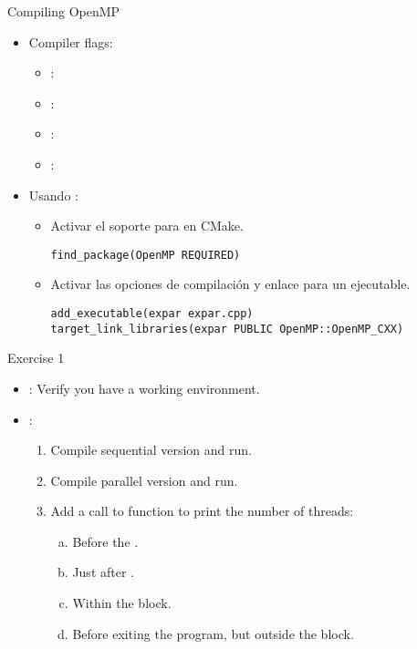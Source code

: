 \begin{frame}[t,fragile]{Compiling OpenMP}

\begin{itemize}
  \item Compiler flags: 
    \begin{itemize}
      \item {}: 
      \item {}: 
      \item {}: 
      \item {}: 
    \end{itemize}

  \item Usando :
  \begin{itemize}
    \item Activar el soporte para  en CMake.
\begin{lstlisting}
find_package(OpenMP REQUIRED)
\end{lstlisting}

    \item Activar las opciones de compilación y enlace para un ejecutable.
\begin{lstlisting}
add_executable(expar expar.cpp)
target_link_libraries(expar PUBLIC OpenMP::OpenMP_CXX)
\end{lstlisting}

  \end{itemize}
\end{itemize}
\end{frame}

\begin{frame}[t]{Exercise 1}
\begin{itemize}
  \item {}: Verify you have a working environment.
  
  \item {}:
  \begin{enumerate}
    \item Compile sequential version and run.
    \item Compile parallel version and run.
    \item Add a call to function  
          to print the number of threads:
      \begin{enumerate}[a)]
        \item Before the .
        \item Just after .
        \item Within the block.
        \item Before exiting the program, but outside the block.
      \end{enumerate}
  \end{enumerate}
\end{itemize}
\end{frame}

